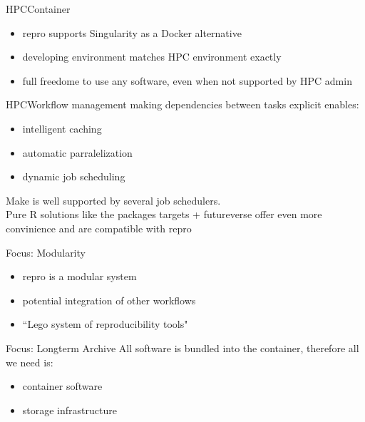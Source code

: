 \documentclass[12pt,t]{beamer}
\begin{document}
\begin{frame}[c]{HPC\textemdash{}Container}
  \begin{itemize}
  \item repro supports Singularity as a Docker alternative
  \item developing environment matches HPC environment exactly
  \item full freedome to use any software, even when not supported by HPC admin
  \end{itemize}
\end{frame}

\begin{frame}[c]{HPC\textemdash{}Workflow management}
  making dependencies between tasks explicit enables:
  \begin{itemize}
  \item intelligent caching
  \item automatic parralelization
  \item dynamic job scheduling
  \end{itemize}
  \vspace{5mm}
  Make is well supported by several job schedulers.\\
  \vspace{5mm}
  Pure R solutions like the packages \textcolor{vhilit}{targets} + \textcolor{hilit}{futureverse} offer even more convinience and are compatible with repro
\end{frame}

\begin{frame}[c]{Focus: Modularity}
\begin{itemize}
	\item<1-> repro is a modular system
	\item<2-> potential integration of other workflows\\
	\item<3-> ``Lego system of reproducibility tools"
\end{itemize}
\end{frame}

\begin{frame}[c]{Focus: Longterm Archive}
	\textcolor<2>{lolit}{All software is bundled into the container, therefore all we need is:}
	\begin{itemize}
		\item \textcolor<2>{lolit}{container software}
		\item \textcolor<2>{lolit}{storage infrastructure}
	\end{itemize}


\end{frame}
\end{document}
